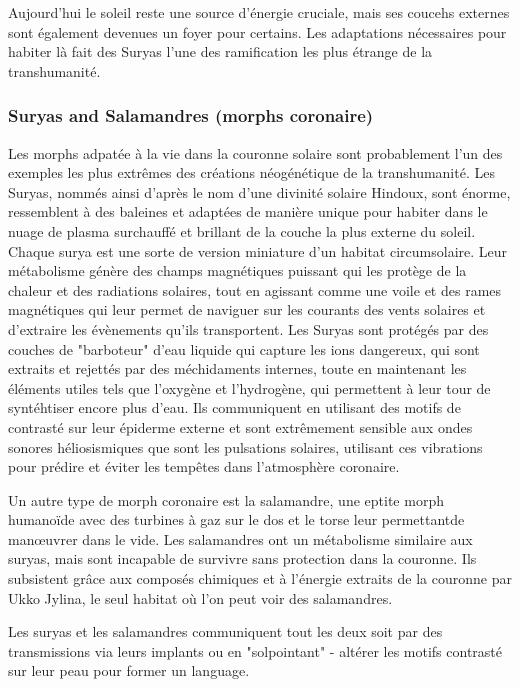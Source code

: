 Aujourd'hui le soleil reste une source d'énergie cruciale, mais ses coucehs externes sont également devenues un foyer pour certains. Les adaptations nécessaires pour habiter là fait des Suryas l'une des ramification les plus étrange de la transhumanité. 

\subsubsection{Suryas and Salamandres (morphs coronaire)} \label{sec:sury-salam-coron} 

Les morphs adpatée à la vie dans la couronne solaire sont probablement l'un des exemples les plus extrêmes des créations néogénétique de la transhumanité. Les Suryas, nommés ainsi d'après le nom d'une divinité solaire Hindoux, sont énorme, ressemblent à des baleines et adaptées de manière unique pour habiter dans le nuage de plasma surchauffé et brillant de la couche la plus externe du soleil. Chaque surya est une sorte de version miniature d'un habitat circumsolaire. Leur métabolisme génère des champs magnétiques puissant qui les protège de la chaleur et des radiations solaires, tout en agissant comme une voile et des rames magnétiques qui leur permet de naviguer sur les courants des vents solaires et d'extraire les évènements qu'ils transportent. Les Suryas sont protégés par des couches de "barboteur" d'eau liquide qui capture les ions dangereux, qui sont extraits et rejettés par des méchidaments internes, toute en maintenant les éléments utiles tels que l'oxygène et l'hydrogène, qui permettent à leur tour de syntéhtiser encore plus d'eau. Ils communiquent en utilisant des motifs de contrasté sur leur épiderme externe et sont extrêmement sensible aux ondes sonores héliosismiques que sont les pulsations solaires, utilisant ces vibrations pour prédire et éviter les tempêtes dans l'atmosphère coronaire. 

Un autre type de morph coronaire est la salamandre, une eptite morph humanoïde avec des turbines à gaz sur le dos et le torse leur permettantde manœuvrer dans le vide. Les salamandres ont un métabolisme similaire aux suryas, mais sont incapable de survivre sans protection dans la couronne. Ils subsistent grâce aux composés chimiques et à l'énergie extraits de la couronne par Ukko Jylina, le seul habitat où l'on peut voir des salamandres. 

Les suryas et les salamandres communiquent tout les deux soit par des transmissions via leurs implants ou en "solpointant" - altérer les motifs contrasté sur leur peau pour former un language. 

